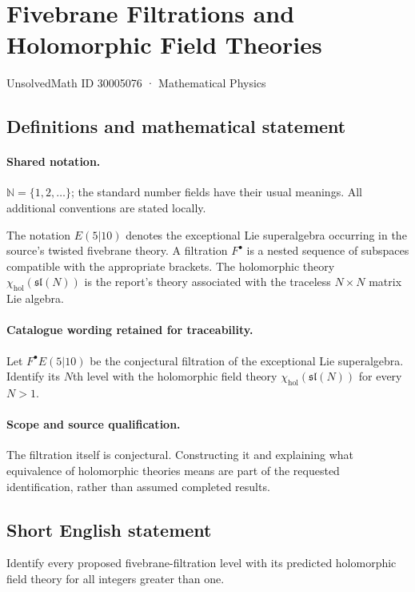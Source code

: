 \documentclass[11pt]{article}
\begin{document}
\setcounter{section}{30005075}
\section{Fivebrane Filtrations and Holomorphic Field Theories}\label{30005076}
{\small UnsolvedMath ID 30005076 · Mathematical Physics}
\subsection{Definitions and mathematical statement}

\paragraph{Shared notation.}$\mathbb N=\{1,2,\ldots\}$; the standard number fields have their usual meanings. All additional conventions are stated locally.


The notation $E(5|10)$ denotes the exceptional Lie superalgebra occurring in the source's twisted fivebrane theory. A filtration $F^\bullet$ is a nested sequence of subspaces compatible with the appropriate brackets. The holomorphic theory $\chi_{\mathrm{hol}}(\mathfrak{sl}(N))$ is the report's theory associated with the traceless $N\times N$ matrix Lie algebra.

\paragraph{Catalogue wording retained for traceability.}
Let $F^\bullet E(5|10)$ be the conjectural filtration of the exceptional Lie superalgebra. Identify its $N$th level with the holomorphic field theory $\chi_{\mathrm{hol}}(\mathfrak{sl}(N))$ for every $N>1$.

\paragraph{Scope and source qualification.}The filtration itself is conjectural. Constructing it and explaining what equivalence of holomorphic theories means are part of the requested identification, rather than assumed completed results.
\subsection{Short English statement}
Identify every proposed fivebrane-filtration level with its predicted holomorphic field theory for all integers greater than one.
\end{document}
